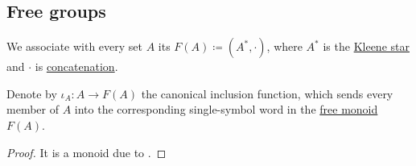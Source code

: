 \subsection{Free groups}\label{subsec:free_groups}

\begin{definition}\label{def:free_monoid}
  We associate with every set \( A \) its  \( F(A) \coloneqq (A^*, \cdot) \), where \( A^* \) is the \hyperref[def:formal_language/kleene_star]{Kleene star} and \( \cdot \) is \hyperref[def:formal_language/concatenation]{concatenation}.

  Denote by \( \iota_A: A \to F(A) \) the canonical inclusion function, which sends every member of \( A \) into the corresponding single-symbol word in the \hyperref[def:free_monoid]{free monoid} \( F(A) \).
\end{definition}
\begin{proof}
  It is a monoid due to .
\end{proof}

